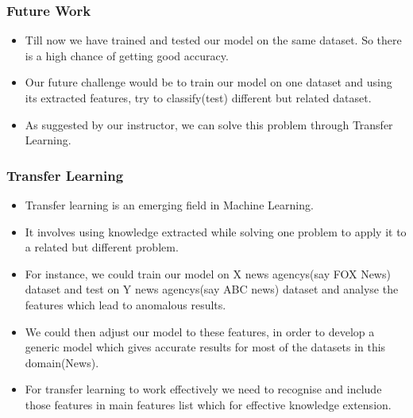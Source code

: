 \documentclass{beamer}
\newcommand\tab[1][1cm]{\hspace*{#1}}
\begin{document}
\begin{frame}
\frametitle{\tab \tab \tab \tab \huge Future Work}
\begin{itemize}
\item Till now we have trained and tested our model on the same dataset. So there is a high chance of getting good accuracy. \linebreak
\item Our future challenge would be to train our model on one dataset and using its extracted features, try to classify(test) different but related dataset. \linebreak
\item As suggested by our instructor, we can solve this problem through Transfer Learning.
\end{itemize}
\end {frame}

\begin{frame}
\frametitle{\tab \tab \tab \tab \huge Transfer Learning}
\begin{itemize}
\item Transfer learning is an emerging field in Machine Learning.
\item It involves using knowledge extracted while solving one problem to apply it to a related but different problem.
\item For instance, we could train our model on X news agency\textquotesingle s(say FOX News) dataset and test on Y news agency\textquotesingle s(say ABC news) dataset and analyse the features which lead to anomalous results.
\item We could then adjust our model to these features, in order to develop a generic model which gives accurate results for most of the datasets in this domain(News).
\item For transfer learning to work effectively we need to recognise and include those features in main features list which for effective knowledge extension.
\end{itemize}
\end {frame}
\end{document}
